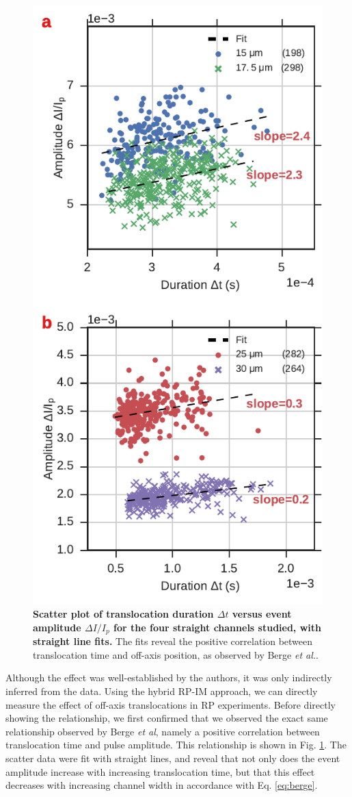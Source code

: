 				
				
				

				
				\begin{figure}
					\includegraphics[width=.5\textwidth]{dIdt.pdf}
					\caption{\textbf{Scatter plot of translocation duration $\Delta t$ versus event amplitude $\Delta I/I_{p}$ for the four straight channels studied, with straight line fits.} The fits reveal the positive correlation between translocation time and off-axis position, as observed by Berge \emph{et al.}.}
					\label{fig:dIdt}
				\end{figure}

				
				Although the effect was well-established by the authors, it was only indirectly inferred from the data. Using the hybrid RP-IM approach, we can directly measure the effect of off-axis translocations in RP experiments. Before directly showing the relationship, we first confirmed that we observed the exact same relationship observed by Berge \emph{et al}, namely a positive correlation between translocation time and pulse amplitude. This relationship is shown in Fig. \ref{fig:dIdt}. The scatter data were fit with straight lines, and reveal that not only does the event amplitude increase with increasing translocation time, but that this effect decreases with increasing channel width in accordance with Eq. \ref{eq:berge}.
				
